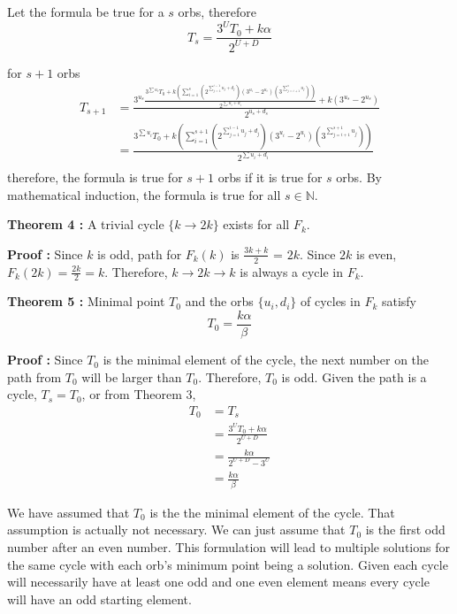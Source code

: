 \documentclass[12pt]{article} %
\begin{document}
Let the formula be true for a $s$ orbs, therefore 
\begin{equation*}
T_s = \frac{3^U T_0 + k \alpha}{2^{U+D}}
\end{equation*}

for $s+1$ orbs
\begin{align*}
T_{s+1} & =\frac{3^{u_s}\frac{3^{\sum u_i}T_0 + k(\sum_{i=1}^{s}(2^{\sum_{j=1}^{i-1}u_j+d_j})(3^{u_i}-2^{u_i})(3^{\sum_{j=i+1}^{s} u_j}))}{2^{\sum u_i+d_i}} +k(3^{u_s}-2^{u_s})}{2^{u_s+d_s}}\\
 & = \frac{3^{\sum u_i}T_0 + k(\sum_{i=1}^{s+1}(2^{\sum_{j=1}^{i-1}u_j+d_j})(3^{u_i}-2^{u_i})(3^{\sum_{j=i+1}^{s+1} u_j}))}{2^{\sum u_i+d_i}}\\
\end{align*}
therefore, the formula is true for $s+1$ orbs if it is true for $s$ orbs. By mathematical induction, the formula is true for all $s \in \mathbb{N}$.
\newline

\textbf{Theorem 4 :}
A trivial cycle  $\{k \rightarrow 2k\}$ exists for all $F_k$.

\textbf{Proof :}
Since $k$ is odd, path for $F_k(k)$ is $\frac{3k+k}{2}$ = $2k$. Since $2k$ is even, $F_k(2k) = \frac{2k}{2} = k$. Therefore, $k \rightarrow 2k \rightarrow k$ is always a cycle in $F_k$.
\newline

\textbf{Theorem 5 :} Minimal point $T_0$ and the orbs $\{u_i, d_i\}$ of cycles in $F_k$ satisfy 
\begin{equation}
    T_0 = \frac{k \alpha}{\beta}
    \label{eq:cycle}
\end{equation}

\textbf{Proof :}
Since $T_0$ is the minimal element of the cycle, the next number on the path from $T_0$ will be larger than $T_0$. Therefore, $T_0$ is odd. Given the path is a cycle, $T_s = T_0$, or from Theorem 3, 
\begin{align*}
T_0 & = T_s \\
    & = \frac{3^U T_0 + k \alpha}{2^{U+D}}\\
    & = \frac{k \alpha}{2^{U+D} - 3^U}\\
    & = \frac{k \alpha}{\beta}
\end{align*} 

We have assumed that $T_0$ is the the minimal element of the cycle. That assumption is actually not necessary. We can just assume that $T_0$ is the first odd number after an even number. This formulation will lead to multiple solutions for the same cycle with each orb's minimum point being a solution. Given each cycle will necessarily have at least one odd and one even element means every cycle will have an odd starting element.
\newline
\end{document}
